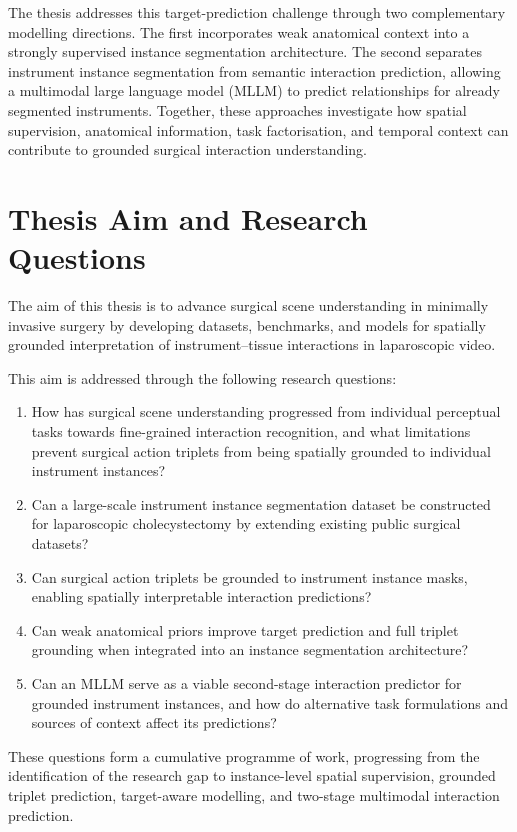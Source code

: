The thesis addresses this target-prediction challenge through two complementary modelling directions. The first incorporates weak anatomical context into a strongly supervised instance segmentation architecture. The second separates instrument instance segmentation from semantic interaction prediction, allowing a multimodal large language model (MLLM) to predict \vtpair relationships for already segmented instruments. Together, these approaches investigate how spatial supervision, anatomical information, task factorisation, and temporal context can contribute to grounded surgical interaction understanding.

\section{Thesis Aim and Research Questions}
\label{sec:introduction-aim}

The aim of this thesis is to advance surgical scene understanding in minimally invasive surgery by developing datasets, benchmarks, and models for spatially grounded interpretation of instrument--tissue interactions in laparoscopic video.

This aim is addressed through the following research questions:
%
\begin{enumerate}
  \item How has surgical scene understanding progressed from individual perceptual tasks towards fine-grained interaction recognition, and what limitations prevent surgical action triplets from being spatially grounded to individual instrument instances?
  \item Can a large-scale instrument instance segmentation dataset be constructed for laparoscopic cholecystectomy by extending existing public surgical datasets?
  \item Can surgical action triplets be grounded to instrument instance masks, enabling spatially interpretable interaction predictions?
  \item Can weak anatomical priors improve target prediction and full triplet grounding when integrated into an instance segmentation architecture?
  \item Can an MLLM serve as a viable second-stage interaction predictor for grounded instrument instances, and how do alternative task formulations and sources of context affect its predictions?
\end{enumerate}

These questions form a cumulative programme of work, progressing from the identification of the research gap to instance-level spatial supervision, grounded triplet prediction, target-aware modelling, and two-stage multimodal interaction prediction.

